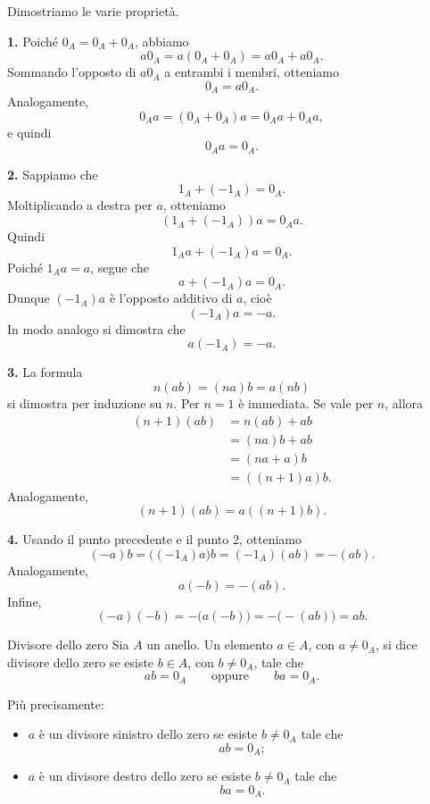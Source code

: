 \documentclass[a4paper]{article}
\begin{document}
\begin{radioactive}
\begin{snippetproof}{}
    Dimostriamo le varie proprietà.

    \textbf{1.} Poiché \(0_A=0_A+0_A\), abbiamo
    \[
        a0_A
        =
        a(0_A+0_A)
        =
        a0_A+a0_A.
    \]
    Sommando l'opposto di \(a0_A\) a entrambi i membri, otteniamo
    \[
        0_A=a0_A.
    \]
    Analogamente,
    \[
        0_Aa=(0_A+0_A)a=0_Aa+0_Aa,
    \]
    e quindi
    \[
        0_Aa=0_A.
    \]

    \textbf{2.} Sappiamo che
    \[
        1_A+(-1_A)=0_A.
    \]
    Moltiplicando a destra per \(a\), otteniamo
    \[
        (1_A+(-1_A))a=0_Aa.
    \]
    Quindi
    \[
        1_Aa+(-1_A)a=0_A.
    \]
    Poiché \(1_Aa=a\), segue che
    \[
        a+(-1_A)a=0_A.
    \]
    Dunque \((-1_A)a\) è l'opposto additivo di \(a\), cioè
    \[
        (-1_A)a=-a.
    \]
    In modo analogo si dimostra che
    \[
        a(-1_A)=-a.
    \]

    \textbf{3.} La formula
    \[
        n(ab)=(na)b=a(nb)
    \]
    si dimostra per induzione su \(n\).
    Per \(n=1\) è immediata.
    Se vale per \(n\), allora
    \begin{align*}
        (n+1)(ab)
        &=
        n(ab)+ab \\
        &=
        (na)b+ab \\
        &=
        (na+a)b \\
        &=
        ((n+1)a)b.
    \end{align*}
    Analogamente,
    \[
        (n+1)(ab)=a((n+1)b).
    \]

    \textbf{4.} Usando il punto precedente e il punto 2, otteniamo
    \[
        (-a)b
        =
        \big((-1_A)a\big)b
        =
        (-1_A)(ab)
        =
        -(ab).
    \]
    Analogamente,
    \[
        a(-b)=-(ab).
    \]
    Infine,
    \[
        (-a)(-b)
        =
        -\big(a(-b)\big)
        =
        -\big(-(ab)\big)
        =
        ab.
    \]
\end{snippetproof}
\end{radioactive}

\begin{radioactive}
\begin{snippetdefinition}{Divisore dello zero}
    Sia \(A\) un anello.
    Un elemento \(a \in A\), con \(a \neq 0_A\), si dice divisore dello zero se esiste \(b \in A\), con \(b \neq 0_A\), tale che
    \[
        ab=0_A
        \qquad
        \text{oppure}
        \qquad
        ba=0_A.
    \]

    Più precisamente:
    \begin{itemize}
        \item \(a\) è un divisore sinistro dello zero se esiste \(b \neq 0_A\) tale che
        \[
            ab=0_A;
        \]
        \item \(a\) è un divisore destro dello zero se esiste \(b \neq 0_A\) tale che
        \[
            ba=0_A.
        \]
    \end{itemize}
\end{snippetdefinition}
\end{radioactive}
\end{document}
